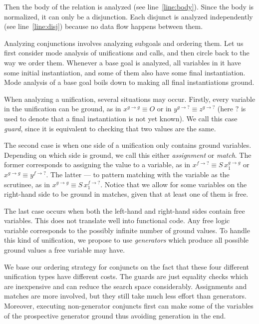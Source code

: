 Then the body of the relation is analyzed (see line~\ref{line:body}).
Since the body is normalized, it can only be a disjunction.
Each disjunct is analyzed independently (see line~\ref{line:disj}) because no data flow happens between them.

Analyzing conjunctions involves analyzing subgoals and ordering them.
Let us first consider mode analysis of unifications and calls, and then circle back to the way we order them.
Whenever a base goal is analyzed, all variables in it have some initial instantiation, and some of them also have some final instantiation.
Mode analysis of a base goal boils down to making all final instantiations ground.

When analyzing a unification, several situations may occur.
Firstly, every variable in the unification can be ground, as in $x^{g \rightarrow g} \equiv O$ or in $y^{g \rightarrow ?} \equiv z^{g \rightarrow ?}$ (here $?$ is used to denote that a final instantiation is not yet known).
We call this case \emph{guard}, since it is equivalent to checking that two values are the same.

The second case is when one side of a unification only contains ground variables.
Depending on which side is ground, we call this either \emph{assignment} or \emph{match}.
The former corresponds to assigning the value to a variable, as in $x^{f \rightarrow ?} \equiv S \, x_1^{g \rightarrow g}$ or $x^{g \rightarrow g} \equiv y^{f \rightarrow ?}$.
The latter --- to pattern matching with the variable as the scrutinee, as in $x^{g \rightarrow g} \equiv S \, x_1^{f \rightarrow ?}$.
Notice that we allow for some variables on the right-hand side to be ground in matches, given that at least one of them is free.

The last case occurs when both the left-hand and right-hand sides contain free variables.
This does not translate well into functional code.
Any free logic variable corresponds to the possibly infinite number of ground values.
To handle this kind of unification, we propose to use \emph{generators} which produce all possible ground values a free variable may have.

We base our ordering strategy for conjuncts on the fact that these four different unification types have different costs.
The guards are just equality checks which are inexpensive and can reduce the search space considerably.
Assignments and matches are more involved, but they still take much less effort than generators.
Moreover, executing non-generator conjuncts first can make some of the variables of the prospective generator ground thus avoiding generation in the end.

